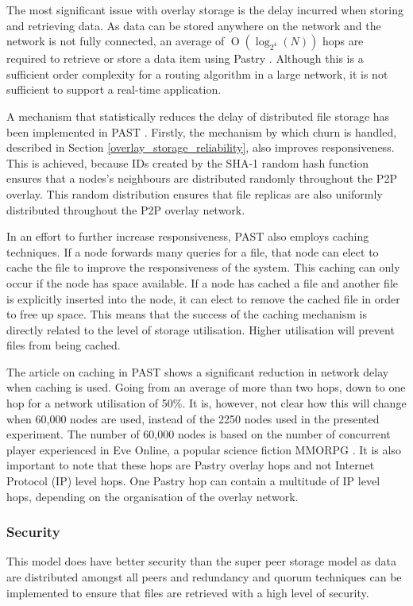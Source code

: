 \documentclass[10pt,a4paper,journal,cspaper,compsoc]{IEEEtran}
\providecommand{\OO}[1]{\operatorname{O}\left(#1\right)}
\begin{document}
The most significant issue with overlay storage is the delay incurred when storing and retrieving data. As data can be stored anywhere on the network
and the network is not fully connected, an average of $\OO{\log_{2^4}(N)}$ hops are required to retrieve or store a data item using Pastry
\cite{storage_and_chaching_PAST}. Although this is a sufficient order complexity for a routing algorithm in a large network, it is not sufficient to
support a real-time application.

A mechanism that statistically reduces the delay of distributed file storage has been implemented in PAST \cite{storage_and_chaching_PAST}. Firstly,
the mechanism by which churn is handled, described in Section \ref{overlay_storage_reliability}, also improves responsiveness.  This is achieved,
because IDs created by the SHA-1 random hash function ensures that a nodes's neighbours are distributed randomly throughout the P2P overlay. This
random distribution ensures that file replicas are also uniformly distributed throughout the P2P overlay network.

In an effort to further increase responsiveness, PAST also employs caching techniques. If a node forwards many queries for a file, that node can
elect to cache the file to improve the responsiveness of the system. This caching can only occur if the node has space available. If a node has
cached a file and another file is explicitly inserted into the node, it can elect to remove the cached file in order to free up space. This means
that the success of the caching mechanism is directly related to the level of storage utilisation. Higher utilisation will prevent files from being
cached.

The article on caching in PAST shows a significant reduction in network delay when caching is used. Going from an average of more than two hops, down
to one hop for a network utilisation of 50\%. It is, however, not clear how this will change when 60,000 nodes are used, instead of the 2250 nodes
used in the presented experiment. The number of 60,000 nodes is based on the number of concurrent player experienced in Eve Online, a popular science
fiction MMORPG \cite{eve_pcu}. It is also important to note that these hops are Pastry overlay hops and not Internet Protocol (IP) level hops. One
Pastry hop can contain a multitude of IP level hops, depending on the organisation of the overlay network.


\subsubsection{Security}
This model does have better security than the super peer storage model as data are distributed amongst all peers and redundancy and quorum techniques
can be implemented to ensure that files are retrieved with a high level of security.
\end{document}
